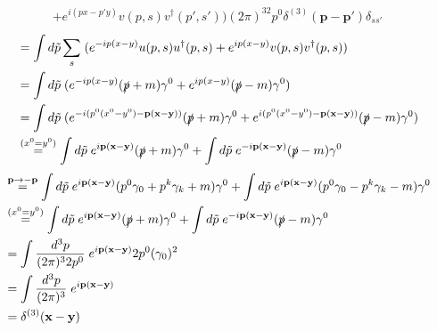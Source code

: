 \documentclass[10pt,a4paper]{report}
\theoremstyle{definition}
\begin{document}
\begin{itemize}
\begin{align}
+e^{i(px-p'y)}v(p,s)v^\dagger(p',s'))(2\pi)^32p^0\delta^{(3)}(\mathbf{p}-\mathbf{p}')\delta_{ss'}
\end{align}
\begin{align}
&=\int d\tilde{p}\sum_s\;(
e^{-ip(x-y)}u(p,s)u^\dagger(p,s)
+e^{ip(x-y)}v(p,s)v^\dagger(p,s))\\
&=\int d\tilde{p}\;
(e^{-ip(x-y)}(\slashed{p}+m)\gamma^0+e^{ip(x-y)}(\slashed{p}-m)\gamma^0)\\
&=\int d\tilde{p}\;
(e^{-i(p^0(x^0-y^0)-\mathbf{p}(\mathbf{x}-\mathbf{y}))}(\slashed{p}+m)\gamma^0+e^{i(p^0(x^0-y^0)-\mathbf{p}(\mathbf{x}-\mathbf{y}))}(\slashed{p}-m)\gamma^0)\\
&\overset{(x^0=y^0)}{=}\int d\tilde{p}\;
e^{i\mathbf{p}(\mathbf{x}-\mathbf{y})}(\slashed{p}+m)\gamma^0+
\int d\tilde{p}\;e^{-i\mathbf{p}(\mathbf{x}-\mathbf{y})}(\slashed{p}-m)\gamma^0
\end{align}
\begin{align}
&\overset{\mathbf{p}\rightarrow-\mathbf{p}}{=}\int d\tilde{p}\;
e^{i\mathbf{p}(\mathbf{x}-\mathbf{y})}(p^0\gamma_0+p^k\gamma_k+m)\gamma^0+
\int d\tilde{p}\;e^{i\mathbf{p}(\mathbf{x}-\mathbf{y})}(p^0\gamma_0-p^k\gamma_k-m)\gamma^0\\
&\overset{(x^0=y^0)}{=}\int d\tilde{p}\;
e^{i\mathbf{p}(\mathbf{x}-\mathbf{y})}(\slashed{p}+m)\gamma^0+
\int d\tilde{p}\;e^{-i\mathbf{p}(\mathbf{x}-\mathbf{y})}(\slashed{p}-m)\gamma^0\\
&=\int \frac{d^3p}{(2\pi)^32p^0}\;
e^{i\mathbf{p}(\mathbf{x}-\mathbf{y})}2p^0(\gamma_0)^2\\
&=\int \frac{d^3p}{(2\pi)^3}\;
e^{i\mathbf{p}(\mathbf{x}-\mathbf{y})}\\
&=\delta^{(3)}(\mathbf{x}-\mathbf{y})
\end{align}


\end{itemize}
\end{document}
